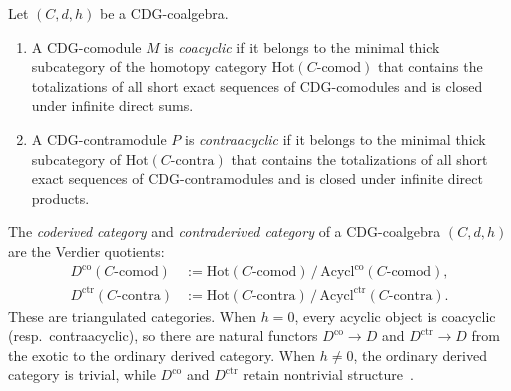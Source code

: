 \begin{definition}
\label{def:coacyclic-contraacyclic}
Let $(C, d, h)$ be a CDG-coalgebra.
\begin{enumerate}[label=\textup{(\roman*)}]
\item A CDG-comodule $M$ is \emph{coacyclic} if it belongs to the
  minimal thick subcategory of the homotopy category
  $\mathrm{Hot}(C\text{-}\mathrm{comod})$ that contains the
  totalizations of all short exact sequences of CDG-comodules
  and is closed under infinite direct sums.
\item A CDG-contramodule $P$ is \emph{contraacyclic} if it belongs
  to the minimal thick subcategory of
  $\mathrm{Hot}(C\text{-}\mathrm{contra})$ that contains the
  totalizations of all short exact sequences of CDG-contramodules
  and is closed under infinite direct products.
\end{enumerate}
\end{definition}

\begin{definition}
\label{def:coderived-contraderived-abstract}
The \emph{coderived category} and \emph{contraderived category}
of a CDG-coalgebra $(C, d, h)$ are the Verdier quotients:
\begin{align}
D^{\mathrm{co}}(C\text{-}\mathrm{comod})
  &:= \mathrm{Hot}(C\text{-}\mathrm{comod})
  \,\big/\, \mathrm{Acycl}^{\mathrm{co}}(C\text{-}\mathrm{comod}),
  \label{eq:coderived-abstract}\\
D^{\mathrm{ctr}}(C\text{-}\mathrm{contra})
  &:= \mathrm{Hot}(C\text{-}\mathrm{contra})
  \,\big/\,
  \mathrm{Acycl}^{\mathrm{ctr}}(C\text{-}\mathrm{contra}).
  \label{eq:contraderived-abstract}
\end{align}
These are triangulated categories.  When $h = 0$, every acyclic
object is coacyclic (resp.\ contraacyclic), so there are natural
functors $D^{\mathrm{co}} \to D$ and $D^{\mathrm{ctr}} \to D$
from the exotic to the ordinary derived category.  When
$h \neq 0$, the ordinary derived category is trivial, while
$D^{\mathrm{co}}$ and $D^{\mathrm{ctr}}$ retain nontrivial
structure~\cite[\S\S3--4]{Positselski11}.
\end{definition}


